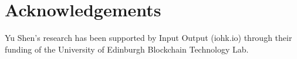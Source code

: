 \section*{Acknowledgements}

Yu Shen's research has been supported by Input Output (iohk.io) through their funding of the University of Edinburgh Blockchain Technology Lab.